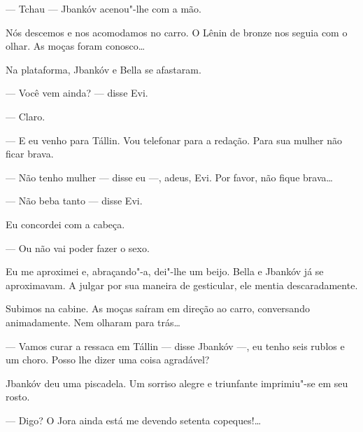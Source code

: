 --- Tchau --- Jbankóv acenou"-lhe com a mão.

Nós descemos e nos acomodamos no carro. O Lênin de bronze nos seguia com
o olhar. As moças foram conosco\ldots{}

Na plataforma, Jbankóv e Bella se afastaram.

--- Você vem ainda? --- disse Evi.

--- Claro.

--- E eu venho para Tállin. Vou telefonar para a redação. Para
sua mulher não ficar brava.

--- Não tenho mulher --- disse eu ---, adeus, Evi.
Por favor, não fique brava\ldots{}

--- Não beba tanto --- disse Evi.

Eu concordei com a cabeça.

--- Ou não vai poder fazer o sexo.

Eu me aproximei e, abraçando"-a, dei"-lhe um beijo. Bella e Jbankóv já se
aproximavam. A julgar por sua maneira de gesticular, ele mentia
descaradamente.

Subimos na cabine. As moças saíram em direção ao carro, conversando
animadamente. Nem olharam para trás\ldots{}

--- Vamos curar a ressaca em Tállin --- disse Jbankóv
---, eu tenho seis rublos e um choro. Posso lhe dizer uma coisa
agradável?

Jbankóv deu uma piscadela. Um sorriso alegre e triunfante imprimiu"-se em
seu rosto.

--- Digo? O Jora ainda está me devendo setenta copeques!\ldots{}

\clearpage
\thispagestyle{empty}

\movetooddpage
\begin{center}
{}
\end{center}

